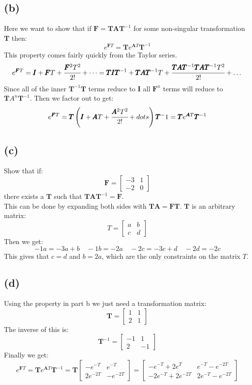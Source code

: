 \documentclass{article}
\begin{document}
\subsection*{(b)}
Here we want to show that if $\pmb{F}=\pmb{T}\pmb{A}\pmb{T}^{-1}$ for some non-singular transformation $\pmb{T}$ then:
\[e^{\pmb{F}T}=\pmb{T}e^{\pmb{A}T}\pmb{T}^{-1}\]
This property comes fairly quickly from the Taylor series.
\[e^{\pmb{F}T}=\pmb{I}+\pmb{F}T+\cfrac{\pmb{F}^2T^2}{2!}+\dots=\pmb{T}\pmb{I}\pmb{T}^{-1}+\pmb{T}\pmb{A}\pmb{T}^{-1}T+\cfrac{\pmb{T}\pmb{A}\pmb{T}^{-1}\pmb{T}\pmb{A}\pmb{T}^{-1}T^2}{2!}+\dots\]
Since all of the inner $\pmb{T}^{-1}\pmb{T}$ terms reduce to $\pmb{I}$ all $\pmb{F}^n$ terms will reduce to $\pmb{T}A^n\pmb{T}^{-1}$. Then we factor out to get:
\[e^{\pmb{F}T}=\pmb{T}\left (\pmb{I}+\pmb{A}T+\cfrac{\pmb{A}^2T^2}{2!}+dots\right )\pmb{T}^-1=\pmb{T}e^{\pmb{A}T}\pmb{T}^{-1}\]

\subsection*{(c)}
Show that if:
\[\pmb{F}=\begin{bmatrix}-3 & 1\\-2 & 0\end{bmatrix}\]
there exists a $\pmb{T}$ such that $\pmb{T}\pmb{A}\pmb{T}^{-1}=\pmb{F}$.\\
This can be done by expanding both sides with $\pmb{T}\pmb{A}=\pmb{F}\pmb{T}$. $\pmb{T}$ is an arbitrary matrix:
\[T=\begin{bmatrix}a &b\\c&d\end{bmatrix}\]
Then we get:
\[-1a=-3a+b\quad -1b=-2a \quad -2c=-3c+d \quad -2d=-2c\]
This gives that $c=d$ and $b=2a$, which are the only constraints on the matrix $T$.\\

\subsection*{(d)}
Using the property in part b we just need a transformation matrix:
\[\pmb{T}=\begin{bmatrix}1&1\\2&1\end{bmatrix}\]
The inverse of this is:
\[\pmb{T}^{-1}=\begin{bmatrix}-1 & 1\\2&-1\end{bmatrix}\]
Finally we get:
\[e^{\pmb{F}T}=\pmb{T}e^{\pmb{A}T}\pmb{T}^{-1}=\pmb{T}\begin{bmatrix}-e^{-T}&e^{-T}\\2e^{-2T}&-e^{-2T}\end{bmatrix}=\begin{bmatrix}-e^{-T}+2e^{T}&e^{-T}-e^{-2T}\\-2e^{-T}+2e^{-2T}&2e^{-T}-e^{-2T}\end{bmatrix}\]
\end{document}
